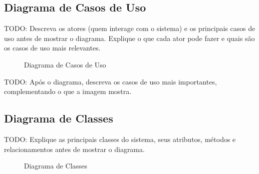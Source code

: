 \subsection{Diagrama de Casos de Uso}
\label{subsec:casos-de-uso}

TODO: Descreva os atores (quem interage com o sistema) e os principais
casos de uso antes de mostrar o diagrama. Explique o que cada ator pode
fazer e quais são os casos de uso mais relevantes.

\begin{figure}[H]
  \caption{Diagrama de Casos de Uso}
  \label{fig:casos-de-uso}
  \centering
  \fbox{\rule{0pt}{6cm}\rule{0.85\textwidth}{0pt}} %
\end{figure}

TODO: Após o diagrama, descreva os casos de uso mais importantes,
complementando o que a imagem mostra.


\subsection{Diagrama de Classes}
\label{subsec:diagrama-classes}

TODO: Explique as principais classes do sistema, seus atributos,
métodos e relacionamentos antes de mostrar o diagrama.

\begin{figure}[H]
  \caption{Diagrama de Classes}
  \label{fig:diagrama-classes}
  \centering
  \fbox{\rule{0pt}{7cm}\rule{0.9\textwidth}{0pt}} %
\end{figure}



%


